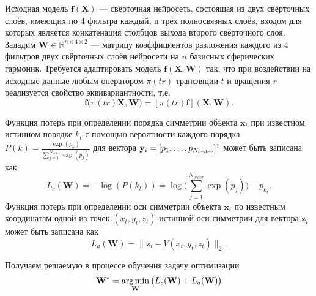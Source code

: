 \documentclass[12pt,twosides]{article}
\begin{document}
	Исходная модель $\mathbf{f(X)}$ --- свёрточная нейросеть, состоящая из двух свёрточных слоёв, имеющих по 4 фильтра каждый, и трёх полносвязных слоёв, входом для которых является конкатенация столбцов выхода второго свёрточного слоя. Зададим $\mathbf{W}\in\mathbb{R}^{n\times4\times2}$ --- матрицу коэффициентов разложения каждого из 4 фильтров двух свёрточных слоёв нейросети на $n$ базисных сферических гармоник. Требуется адаптировать модель $\mathbf{f(X, W)}$ так, что при воздействии на исходные данные любым оператором $\pi(tr)$ трансляции $t$ и вращения $r$ реализуется свойство эквивариантности, т.е.
	$$\mathbf{f}(\pi(tr)\mathbf{X,W)}=[\pi(tr)\mathbf{f}]\mathbf{(X,W)}.$$
	
	Функция потерь при определении порядка симметрии объекта $\mathbf{x}_i$ при известном истинном порядке $k_{t}$ с помощью вероятности каждого порядка   $P(k)=\frac{\exp(p_k)}{\sum_{j=1}^{N_{order}}\exp(p_j)}$ для вектора $\mathbf{y}_i=[p_1,\dots,p_{N_{order}}]^{\text{\tiny\sffamily\upshape\mdseries T}}$ может быть записана как
	$$L_c(\mathbf{W})=-\log(P(k_{t}))=\log\Bigg(\sum_{j=1}^{N_{order}}\exp(p_j)\Bigg)-p_{k_{t}}.$$
	Функция потерь при определении оси симметрии объекта $\mathbf{x}_i$ по известным координатам одной из точек $(x_{t},y_{t},z_{t})$ истинной оси симметрии для вектора $\mathbf{z}_i$ может быть записана как
	$$L_a(\mathbf{W})=\|\mathbf{z}_i-V(x_{t},y_{t},z_{t})\|_2.$$
	
	Получаем решаемую в процессе обучения задачу оптимизации
	$$\mathbf{W}^*=\argmin_{\textbf{W}}\big(L_c(\mathbf{W})+L_a(\mathbf{W})\big)$$


	
	
	
\end{document}
